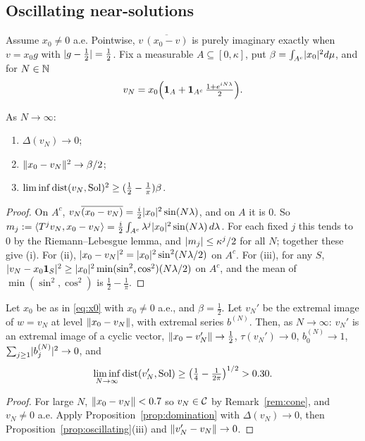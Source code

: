\subsection{Oscillating near-solutions}
Assume $x_0\ne0$ a.e. Pointwise, $v\,\overline{(x_0-v)}$ is purely imaginary exactly when
$v=x_0g$ with $\lvert g-\frac12\rvert=\frac12$. Fix a measurable $A\subseteq[0,\kappa]$, put
$\beta=\int_{A^c}\lvert x_0\rvert^2d\mu$, and for $N\in\mathbb{N}$
\[
v_N=x_0\Bigl(\mathbf 1_A+\mathbf 1_{A^c}\,\tfrac{1+e^{iN\lambda}}2\Bigr).
\]

\begin{proposition}\label{prop:oscillating}\stproved{}
As $N\to\infty$:
\begin{enumerate}[label=(\roman*)]
\item $\Delta(v_N)\to0$;
\item $\lVert x_0-v_N\rVert^2\to\beta/2$;
\item $\liminf\operatorname{dist}(v_N,\operatorname{Sol})^2\ge(\frac12-\frac1\pi)\beta$.
\end{enumerate}
\end{proposition}
\begin{proof}
On $A^c$, $v_N\overline{(x_0-v_N)}=\frac i2\lvert x_0\rvert^2\sin(N\lambda)$, and on $A$ it is $0$. So
$m_j:=\langle T^jv_N,x_0-v_N\rangle=\frac i2\int_{A^c}\lambda^j\lvert x_0\rvert^2\sin(N\lambda)\,d\lambda$. For each
fixed $j$ this tends to $0$ by the Riemann--Lebesgue lemma, and $\lvert m_j\rvert\le\kappa^j/2$ for all
$N$; together these give (i). For (ii),
$\lvert x_0-v_N\rvert^2=\lvert x_0\rvert^2\sin^2(N\lambda/2)$ on $A^c$. For (iii), for any $S$,
$\lvert v_N-x_0\mathbf 1_S\rvert^2\ge\lvert x_0\rvert^2\min(\sin^2,\cos^2)(N\lambda/2)$ on $A^c$, and the mean
of $\min(\sin^2,\cos^2)$ is $\frac12-\frac1\pi$.
\end{proof}

\begin{corollary}\label{cor:obstruction}\stproved{}
Let $x_0$ be as in \eqref{eq:x0} with $x_0\ne0$ a.e., and $\beta=\frac12$. Let $v_N'$ be the
extremal image of $w=v_N$ at level $\lVert x_0-v_N\rVert$, with extremal series $b^{(N)}$. Then, as
$N\to\infty$: $v_N'$ is an extremal image of a cyclic vector, $\lVert x_0-v_N'\rVert\to\frac12$,
$\tau(v_N')\to0$, $b^{(N)}_0\to1$, $\sum_{j\ge1}\lvert b^{(N)}_j\rvert^2\to0$, and
\[
\liminf_{N\to\infty}\operatorname{dist}(v_N',\operatorname{Sol})\ge\bigl(\tfrac14-\tfrac1{2\pi}\bigr)^{1/2}>0.30 .
\]
\end{corollary}
\begin{proof}
For large $N$, $\lVert x_0-v_N\rVert<0.7$ so $v_N\in\mathcal{C}$ by Remark~\ref{rem:cone}, and $v_N\ne0$ a.e.
Apply Proposition~\ref{prop:domination} with $\Delta(v_N)\to0$, then
Proposition~\ref{prop:oscillating}(iii) and $\lVert v_N'-v_N\rVert\to0$.
\end{proof}

